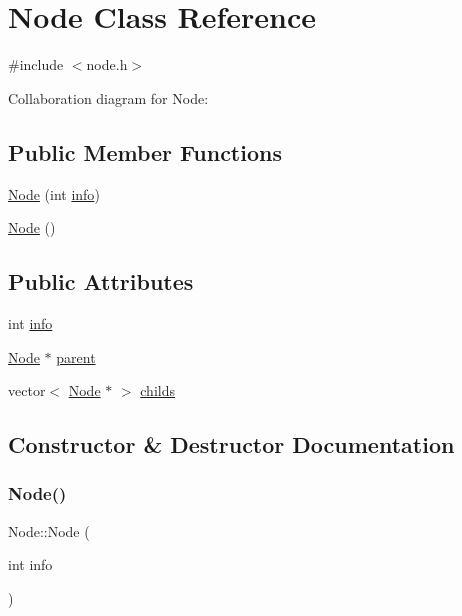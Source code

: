 \hypertarget{class_node}{}\section{Node Class Reference}
\label{class_node}


{\ttfamily \#include $<$node.\+h$>$}



Collaboration diagram for Node\+:
\subsection*{Public Member Functions}
\begin{DoxyCompactItemize}
\item 
\mbox{\hyperlink{class_node_a448d242b74cb8422bf239d92267c53f1}{Node}} (int \mbox{\hyperlink{class_node_a9d0627058327302f27c2b8e3b69bcf72}{info}})
\item 
\mbox{\hyperlink{class_node_ad7a34779cad45d997bfd6d3d8043c75f}{Node}} ()
\end{DoxyCompactItemize}
\subsection*{Public Attributes}
\begin{DoxyCompactItemize}
\item 
int \mbox{\hyperlink{class_node_a9d0627058327302f27c2b8e3b69bcf72}{info}}
\item 
\mbox{\hyperlink{class_node}{Node}} $\ast$ \mbox{\hyperlink{class_node_ad8184598cdea70e4bbdfd76f2b0f9e85}{parent}}
\item 
vector$<$ \mbox{\hyperlink{class_node}{Node}} $\ast$ $>$ \mbox{\hyperlink{class_node_acc82c6348fd723e07aaf27bda5c2ea8a}{childs}}
\end{DoxyCompactItemize}


\subsection{Constructor \& Destructor Documentation}
\mbox{\label{class_node_a448d242b74cb8422bf239d92267c53f1}} 
\subsubsection{\texorpdfstring{Node()}{Node()}\hspace{0.1cm}{\footnotesize\ttfamily [1/2]}}
{\footnotesize\ttfamily Node\+::\+Node (\begin{DoxyParamCaption}\item[{int}]{info }\end{DoxyParamCaption})}

